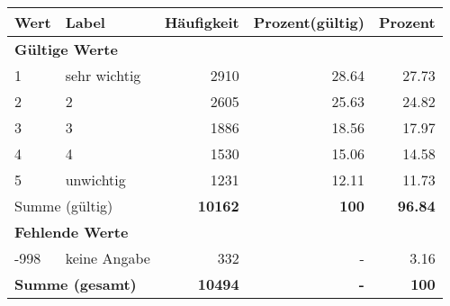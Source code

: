      \begin{longtable}{lXrrr}
     \toprule
     \textbf{Wert} & \textbf{Label} & \textbf{Häufigkeit} & \textbf{Prozent(gültig)} & \textbf{Prozent} \\
     \endhead
     \midrule
     \multicolumn{5}{l}{\textbf{Gültige Werte}}\\

     1 &
     \multicolumn{1}{X}{ sehr wichtig   } &


       \num{2910} &
       \num[round-mode=places,round-precision=2]{28,64} &
         \num[round-mode=places,round-precision=2]{27,73} \\

     2 &
     \multicolumn{1}{X}{ 2   } &


       \num{2605} &
       \num[round-mode=places,round-precision=2]{25,63} &
         \num[round-mode=places,round-precision=2]{24,82} \\

     3 &
     \multicolumn{1}{X}{ 3   } &


       \num{1886} &
       \num[round-mode=places,round-precision=2]{18,56} &
         \num[round-mode=places,round-precision=2]{17,97} \\

     4 &
     \multicolumn{1}{X}{ 4   } &


       \num{1530} &
       \num[round-mode=places,round-precision=2]{15,06} &
         \num[round-mode=places,round-precision=2]{14,58} \\

     5 &
     \multicolumn{1}{X}{ unwichtig   } &


       \num{1231} &
       \num[round-mode=places,round-precision=2]{12,11} &
         \num[round-mode=places,round-precision=2]{11,73} \\
     \midrule
     \multicolumn{2}{l}{Summe (gültig)} &
       \textbf{\num{10162}} &
     \textbf{100} &
       \textbf{\num[round-mode=places,round-precision=2]{96,84}} \\
     \multicolumn{5}{l}{\textbf{Fehlende Werte}}\\
       -998 &
       keine Angabe &
         \num{332} &
        - &
         \num[round-mode=places,round-precision=2]{3,16} \\
     \midrule
     \multicolumn{2}{l}{\textbf{Summe (gesamt)}} &
          \textbf{\num{10494}} &
        \textbf{-} &
        \textbf{100} \\
     \bottomrule
     \end{longtable}
     
